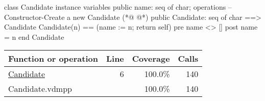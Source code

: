 \begin{vdmpp}
class Candidate
instance variables
 public name: seq of char;
operations
--Constructor-Create a new Candidate
(*@
\label{Candidate:6}
@*)
 public Candidate: seq of char ==> Candidate
 Candidate(n) == (name := n; return self)
 pre name <> []
 post name = n
end Candidate
\end{vdmpp}
\bigskip
\begin{longtable}{|l|r|r|r|}
\hline
Function or operation & Line & Coverage & Calls \\
\hline
\hline
\hyperref[Candidate:6]{Candidate} & 6&100.0\% & 140 \\
\hline
\hline
Candidate.vdmpp & & 100.0\% & 140 \\
\hline
\end{longtable}

